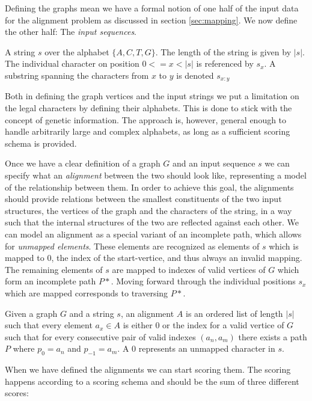 \documentclass[thesis.tex]{subfiles}
\begin{document}
{\parindent0pt
Defining the graphs mean we have a formal notion of one half of the input data for the alignment problem as discussed in section \ref{sec:mapping}. We now define the other half: The \textit{input sequences}.
\begin{defn}
  A string $s$ over the alphabet $\{A, C, T, G\}$. The length of the string is given by $|s|$. The individual character on position $0<=x<|s|$ is referenced by $s_x$. A substring spanning the characters from $x$ to $y$ is denoted $s_{x:y}$
\end{defn}
Both in defining the graph vertices and the input strings we put a limitation on the legal characters by defining their alphabets. This is done to stick with the concept of genetic information. The approach is, however, general enough to handle arbitrarily large and complex alphabets, as long as a sufficient scoring schema is provided.\\
\par\noindent
Once we have a clear definition of a graph $G$ and an input sequence $s$ we can specify what an \textit{alignment} between the two should look like, representing a model of the relationship between them. In order to achieve this goal, the alignments should provide relations between the smallest constituents of the two input structures, the vertices of the graph and the characters of the string, in a way such that the internal structures of the two are reflected against each other. We can model an alignment as a special variant of an incomplete path, which allows for \textit{unmapped elements}. These elements are recognized as elements of $s$ which is mapped to $0$, the index of the start-vertice, and thus always an invalid mapping. The remaining elements of $s$ are mapped to indexes of valid vertices of $G$ which form an incomplete path $P*$. Moving forward through the individual positions $s_x$ which are mapped corresponds to traversing $P*$.
\begin{defn}[Alignment]
  Given a graph $G$ and a string $s$, an alignment $A$ is an ordered list of length $|s|$ such that every element $a_x \in A$ is either $0$ or the index for a valid vertice of $G$ such that for every consecutive pair of valid indexes $(a_n, a_m)$ there exists a path $P$ where $p_0=a_n$ and $p_{-1}=a_m$. A $0$ represents an unmapped character in $s$.
\end{defn}
When we have defined the alignments we can start scoring them. The scoring happens according to a scoring schema and should be the sum of three different scores:
}
\end{document}
